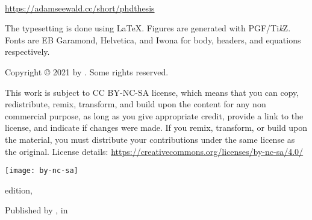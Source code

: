 
%
%
{\small\setlength{\parindent}{0em}\setlength{\parskip}{1em}
~

\vfill


\url{https://adamseewald.cc/short/phdthesis}

The typesetting is done using \LaTeX. Figures are generated with PGF/Ti\textit{k}Z. Fonts are EB Garamond, Helvetica, and Iwona for body, headers, and equations respectively.


Copyright \copyright{} 2021 by \authorname. Some rights reserved.

This work is subject to CC BY-NC-SA license, which means that you can copy, redistribute, remix, transform, and build upon the content for any non commercial purpose, as long as you give appropriate credit, provide a link to the license, and indicate if changes were made. If you remix, transform, or build upon the material, you must distribute your contributions under the same license as the original. License details: \url{https://creativecommons.org/licenses/by-nc-sa/4.0/}

\texttt{[image: by-nc-sa]}

\edition{} edition, \editionyear{}


Published by \publisher{}, in \place{}
}\cleardoublepage
